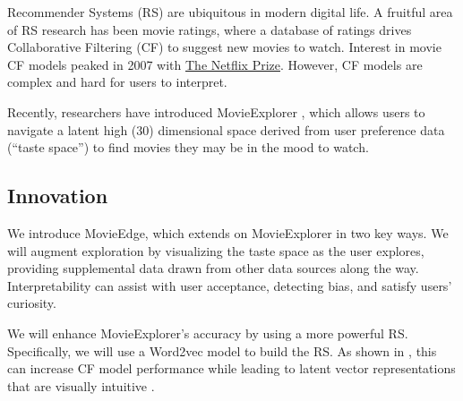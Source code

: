 Recommender Systems (RS) are ubiquitous in modern digital life. A fruitful area of RS research has been movie ratings, where a database of ratings drives Collaborative Filtering (CF) to suggest new movies to watch. Interest in movie CF models peaked in 2007 with \href{https://www.netflixprize.com/}{The Netflix Prize}. However, CF models are complex and hard for users to interpret.

Recently, researchers have introduced MovieExplorer \cite{taijala2018movieexplorer}, which allows users to navigate a latent high (30) dimensional space derived from user preference data (“taste space”) to find movies they may be in the mood to watch. 

\subsection{Innovation}

We introduce MovieEdge, which extends on MovieExplorer in two key ways.  We will augment exploration by visualizing the taste space as the user explores, providing supplemental data drawn from other data sources \cite{openMovieDB} along the way. Interpretability  \cite{Molnar2019interpretable} can assist with user acceptance, detecting bias, and satisfy users’ curiosity. 

We will enhance MovieExplorer’s accuracy  by using a more powerful RS. Specifically, we will use a Word2vec model \cite{mikolov2013distributed} to build the RS. As shown in \cite{ozsoy2016word}, this can increase CF model performance while leading to latent vector representations that are visually intuitive \cite{mikolov2013distributed}. 